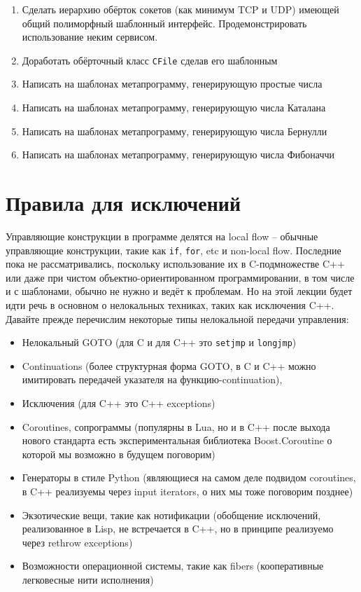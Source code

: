 \documentclass[a4paper,12pt,oneside]{article}
\begin{document}
\begin{enumerate}
\item
Сделать иерархию обёрток сокетов (как минимум TCP и UDP) имеющей общий полиморфный шаблонный интерфейс. Продемонстрировать использование неким сервисом.

\item
Доработать обёрточный класс \lstinline!CFile! сделав его шаблонным

\item
Написать на шаблонах метапрограмму, генерирующую простые числа

\item
Написать на шаблонах метапрограмму, генерирующую числа Каталана

\item
Написать на шаблонах метапрограмму, генерирующую числа Бернулли 

\item
Написать на шаблонах метапрограмму, генерирующую числа Фибоначчи

\end{enumerate}

\pagebreak
\section{Правила для исключений}

Управляющие конструкции в программе делятся на local flow -- обычные управляющие конструкции, такие как \lstinline!if!, \lstinline!for!, etc и non-local flow. Последние пока не рассматривались, поскольку использование их в C-подмножестве C++ или даже при чистом объектно-ориентированном программировании, в том числе и с шаблонами, обычно не нужно и ведёт к проблемам. Но на этой лекции будет идти речь в основном о нелокальных техниках, таких как исключения C++. Давайте прежде перечислим некоторые типы нелокальной передачи управления:

\begin{itemize}
\item
Нелокальный GOTO (для C и для C++ это \lstinline!setjmp! и \lstinline!longjmp!)
\item
Continuations (более структурная форма GOTO, в C и C++ можно имитировать передачей указателя на функцию-continuation), 
\item
Исключения (для C++ это C++ exceptions)
\item
Coroutines, сопрограммы (популярны в Lua, но и в C++ после выхода нового стандарта есть экспериментальная библиотека Boost.Coroutine о которой мы возможно в будущем поговорим)
\item
Генераторы в стиле Python (являющиеся на самом деле подвидом coroutines, в C++ реализуемы через input iterators, о них мы тоже поговорим позднее)
\item
Экзотические вещи, такие как нотификации (обобщение исключений, реализованное в Lisp, не встречается в C++, но в принципе реализуемо через rethrow exceptions)
\item
Возможности операционной системы, такие как fibers (кооперативные легковесные нити исполнения)
\end{itemize}
\end{document}
